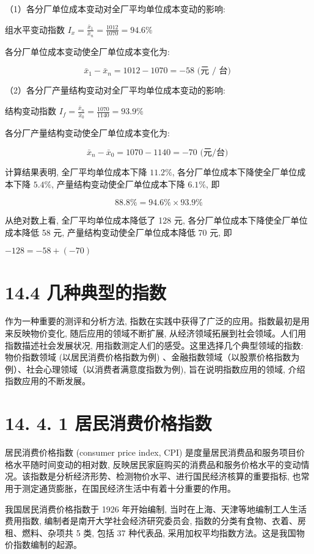 \documentclass[10pt]{article}
\begin{document}
\begin{CJK*}{UTF8}{bsmi}
（1）各分厂单位成本变动对全厂平均单位成本变动的影响:

组水平变动指数 $I_{x}=\frac{\bar{x}_{1}}{\bar{x}_{n}}=\frac{1012}{1070}=94.6 \%$

各分厂单位成本变动使全厂单位成本变化为:

$$
\bar{x}_{1}-\bar{x}_{n}=1012-1070=-58 \text { (元 } / \text { 台) }
$$

（2）各分厂产量结构变动对全厂平均单位成本变动的影响:

结构变动指数 $I_{f}=\frac{\bar{x}_{n}}{\bar{x}_{0}}=\frac{1070}{1140}=93.9 \%$

各分厂产量结构变动使全厂单位成本变化为:

$$
\bar{x}_{n}-\bar{x}_{0}=1070-1140=-70 \text { (元/台) }
$$

计算结果表明, 全厂平均单位成本下降 $11.2 \%$, 各分厂单位成本下降使全厂单位成本下降 $5.4 \%$, 产量结构变动使全厂单位成本下降 $6.1 \%$, 即

$$
88.8 \%=94.6 \% \times 93.9 \%
$$

从绝对数上看, 全厂平均单位成本降低了 128 元, 各分厂单位成本下降使全厂单位成本降低 58 元, 产量结构变动使全厂单位成本降低 70 元, 即

$-128=-58+(-70)$

\section*{14.4 几种典型的指数}
作为一种重要的测评和分析方法, 指数在实践中获得了广泛的应用。指数最初是用来反映物价变化, 随后应用的领域不断扩展, 从经济领域拓展到社会领域。人们用指数描述社会发展状况, 用指数测定人们的感受。这里选择几个典型领域的指数: 物价指数领域 (以居民消费价格指数为例) 、金融指数领域（以股票价格指数为例）、社会心理领域（以消费者满意度指数为例), 旨在说明指数应用的领域, 介绍指数应用的不断发展。

\section*{14. 4. 1 居民消费价格指数}
居民消费价格指数 (consumer price index, CPI) 是度量居民消费品和服务项目价格水平随时间变动的相对数, 反映居民家庭购买的消费品和服务价格水平的变动情况。该指数是分析经济形势、检测物价水平、进行国民经济核算的重要指标, 也常用于测定通货膨胀，在国民经济生活中有着十分重要的作用。

我国居民消费价格指数于 1926 年开始编制, 当时在上海、天津等地编制工人生活费用指数, 编制者是南开大学社会经济研究委员会, 指数的分类有食物、衣着、房租、燃料、杂项共 5 类, 包括 37 种代表品, 采用加权平均指数方法。这是我国物价指数编制的起源。


\end{CJK*}
\end{document}
